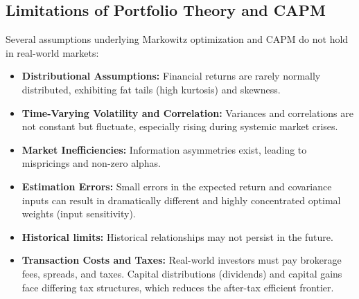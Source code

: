 \subsection{Limitations of Portfolio Theory and CAPM}
\label{subsec:Limitations}
Several assumptions underlying Markowitz optimization and CAPM do not hold in real-world markets:
\begin{itemize}
	\item \textbf{Distributional Assumptions:} Financial returns are rarely normally distributed, exhibiting fat tails (high kurtosis) and skewness.
	\item \textbf{Time-Varying Volatility and Correlation:} Variances and correlations are not constant but fluctuate, especially rising during systemic market crises.
	\item \textbf{Market Inefficiencies:} Information asymmetries exist, leading to mispricings and non-zero alphas.
	\item \textbf{Estimation Errors:} Small errors in the expected return and covariance inputs can result in dramatically different and highly concentrated optimal weights (input sensitivity).
	\item \textbf{Historical limits:} Historical relationships may not persist in the future.
	\item \textbf{Transaction Costs and Taxes:} Real-world investors must pay brokerage fees, spreads, and taxes. Capital distributions (dividends) and capital gains face differing tax structures, which reduces the after-tax efficient frontier.
\end{itemize}
% 
